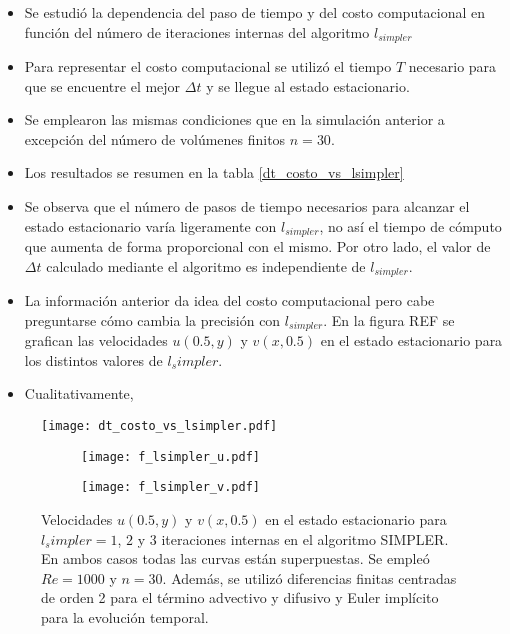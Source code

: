 \documentclass[aps,prb,twocolumn,superscriptaddress,floatfix,longbibliography,10pt]{revtex4-2}
\newcounter{para}
\begin{document}
\begin{itemize}
  \item Se estudió la dependencia del paso de tiempo y del costo computacional en función del número de iteraciones internas del algoritmo $l_{simpler}$
  \item Para representar el costo computacional se utilizó el tiempo $T$ necesario para que se encuentre el mejor $\Delta t$ y se llegue al estado estacionario.
  \item Se emplearon las mismas condiciones que en la simulación anterior a excepción del número de volúmenes finitos $n = 30$.
  \item Los resultados se resumen en la tabla \ref{dt_costo_vs_lsimpler}
  \item Se observa que el número de pasos de tiempo necesarios para alcanzar el estado estacionario varía ligeramente con $l_{simpler}$, no así el tiempo de cómputo que aumenta de forma proporcional con el mismo. Por otro lado, el valor de $\Delta t$ calculado mediante el algoritmo es independiente de $l_{simpler}$.
  \item La información anterior da idea del costo computacional pero cabe preguntarse cómo cambia la precisión con $l_{simpler}$. En la figura REF se grafican las velocidades $u(0.5,y)$ y $v(x,0.5)$ en el estado estacionario para los distintos valores de $l_simpler$.
  \item Cualitativamente, 
\end{itemize}

\begin{figure}[h]
  \texttt{[image: dt\_costo\_vs\_lsimpler.pdf]}
  \caption{}
   \label{fig:dt_costo_vs_lsimpler}
\end{figure}

\begin{figure}
  \centering
  \begin{subfigure}[b]{0.3\textwidth}
      \centering
      \texttt{[image: f\_lsimpler\_u.pdf]}
      \caption{}
      \label{fig:lsimpler_u}
  \end{subfigure}
  \hfill
  \begin{subfigure}[b]{0.3\textwidth}
      \centering
      \texttt{[image: f\_lsimpler\_v.pdf]}
      \caption{}
      \label{fig:three sin x}
  \end{subfigure}
     \caption{Velocidades $u(0.5,y)$ y $v(x,0.5)$ en el estado estacionario para $l_simpler = 1$, $2$ y $3$ iteraciones internas en el algoritmo SIMPLER. En ambos casos todas las curvas están superpuestas. Se empleó $Re = 1000$ y $n = 30$. Además, se utilizó diferencias finitas centradas de orden 2 para el término advectivo y difusivo y Euler implícito para la evolución temporal.}
     \label{fig:lsimpler_v}
\end{figure}
\end{document}
